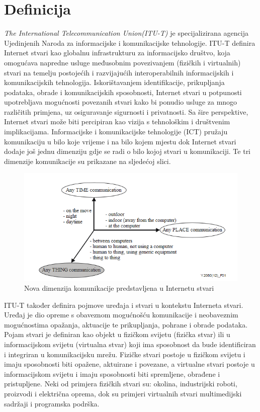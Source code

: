 \documentclass[times, utf8, diplomski]{fer}
\begin{document}
\section{Definicija}
\emph{The International Telecommunication Union(ITU-T)} je specijalizirana agencija Ujedinjenih Naroda za informacijske i komunikacijske tehnologije. ITU-T definira Internet stvari kao globalnu infrastrukturu za informacijsko društvo, koja omogućava napredne usluge međusobnim povezivanjem (fizičkih i virtualnih) stvari na temelju postojećih i razvijajućih interoperabilnih informacijskih i komunikacijskih tehnologija. Iskorištavanjem identifikacije, prikupljanja podataka, obrade i komunikacijskih sposobnosti, Internet stvari u potpunosti upotrebljava mogućnosti povezanih stvari kako bi ponudio usluge za mnogo različitih primjena, uz osiguravanje sigurnosti i privatnosti. Sa šire perspektive, Internet stvari može biti percipiran kao vizija s tehnološkim i društvenim implikacijama\citep{ITU-T/IoT}. Informacijske i komunikacijske tehnologije (ICT) pružaju komunikaciju u bilo koje vrijeme i na bilo kojem mjestu dok Internet stvari dodaje još jednu dimenziju gdje se radi o bilo kojoj stvari u komunikaciji. Te tri dimenzije komunikacije su prikazane na sljedećoj slici.
\begin{figure}[htb]
    \centering
    \includegraphics[width=14cm]{images/3dimenzije.png}
    \caption{Nova dimenzija komunikacije predstavljena u Internetu stvari\citep{ITU-T/IoT}}
    \label{fig:3-dim}
\end{figure}

ITU-T također definira pojmove uređaja i stvari u kontekstu Interneta stvari. Uređaj je dio opreme s obaveznom mogućnošću komunikacije i neobaveznim mogućnostima opažanja, aktuacije te prikupljanja, pohrane i obrade podataka. Pojam stvari je definiran kao objekt u fizičkom svijetu (fizička stvar) ili u informacijskom svijetu (virtualna stvar) koji ima sposobnost da bude identificiran i integriran u komunikacijsku mrežu. Fizičke stvari postoje u fizičkom svijetu i imaju sposobnosti biti opažene, aktuirane i povezane, a virtualne stvari postoje u informacijskom svijetu i imaju sposobnosti biti spremljene, obrađene i pristupljene. Neki od primjera fizičkih stvari su: okolina, industrijski roboti, proizvodi i električna oprema, dok su primjeri virtualnih stvari multimedijski sadržaji i programska podrška.
\end{document}
